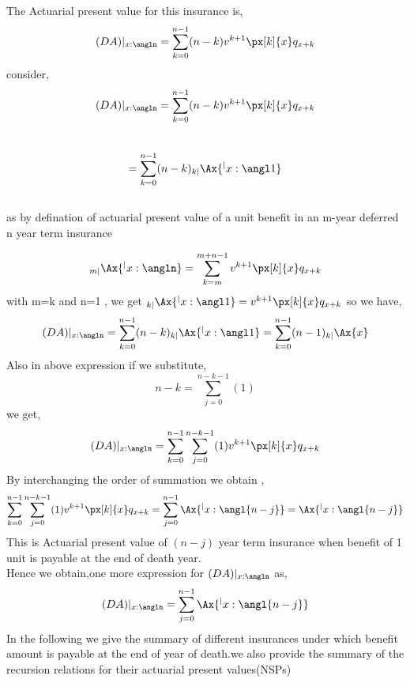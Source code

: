 
The Actuarial present value for this insurance is,
$$(DA)|_{x:\angln}=\sum_{k=0}^{n-1}(n-k)v^{k+1}\px[k]{x}q_{x+k}$$
consider,
$$(DA)|_{x:\angln}=\sum_{k=0}^{n-1}(n-k)v^{k+1}\px[k]{x}q_{x+k}$$\\
$$=\sum_{k=0}^{n-1}(n-k)_{k|}\Ax{^|{x:\angl1}}$$\\
as by defination of actuarial present value of a unit benefit in an m-year deferred n year term insurance

$$_{m|}{\Ax{^|{x:\angln}}}=\sum_{k=m}^{m+n-1}v^{k+1}\px[k]{x}q_{x+k} $$
with m=k and n=1 , we get $_{k|}\Ax{^|{x:\angl1}}=v^{k+1}\px[k]{x}q_{x+k}$
so we have,
$$(DA)|_{x:\angln}=\sum_{k=0}^{n-1}(n-k)_{k|}\Ax{^|{x:\angl1}}=\sum_{k=0}^{n-1}(n-1)_{k|}\Ax{x}$$
Also in above expression if we substitute,
$$n-k=\sum_{j=0}^{n-k-1}(1)$$
we get,
$$(DA)|_{x:\angln}=\sum_{k=0}^{n-1}\sum_{j=0}^{n-k-1}(1)v^{k+1}\px[k]{x}q_{x+k}$$
By interchanging the order of summation we obtain ,
$$\sum_{k=0}^{n-1}\sum_{j=0}^{n-k-1}(1)v^{k+1}\px[k]{x}q_{x+k}=\sum_{j=0}^{n-1}\Ax{^|{x:\angl{n-j}}}=\Ax{^|{x:\angl{n-j}}}$$
This is Actuarial present value of  $(n-j)$ year term insurance  when benefit of 1  unit is payable at the end of death year.\\
Hence we obtain,one more expression for $(DA)|_{x:\angln}$ as,
$$(DA)|_{x:\angln}=\sum_{j=0}^{n-1}\Ax{^|{x:\angl{n-j}}}$$
In the following we give the summary of different insurances under which benefit amount is payable at the end of year of death.we also provide the summary of the recursion relations for their actuarial present values(NSPs)



